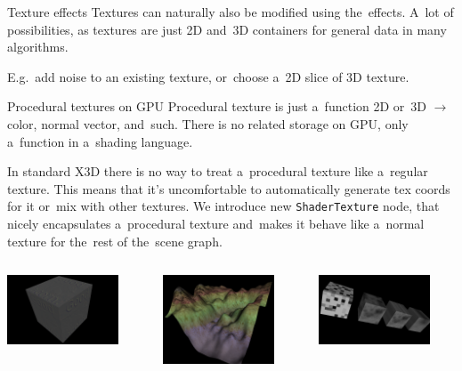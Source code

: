 \documentclass{beamer}
\begin{document}
\begin{frame}[fragile]{Texture effects}
Textures can naturally also be modified using the~effects.
A~lot of possibilities, as textures are just 2D and~3D containers for general data
in many algorithms.

\vspace{0.1in}

E.g.~add noise to an existing texture, or~choose a~2D slice of 3D texture.
\end{frame}

\begin{frame}[fragile]{Procedural textures on GPU}
Procedural texture is just a~function 2D or~3D $\rightarrow$
color, normal vector, and~such.
There is no related storage on GPU, only a~function
in a~shading language.

\vspace{0.1in}

In standard X3D there is no way to treat a~procedural texture
like a~regular texture. This means that it's uncomfortable
to automatically generate tex coords for it or~mix with other textures.
We introduce new \texttt{ShaderTexture} node, that nicely
encapsulates a~procedural texture and~makes it behave like a~normal texture
for the~rest of the~scene graph.

\begin{center}
\begin{columns}[T]
  \begin{column}{1in}
    \includegraphics[width=1.3in]{../shader_texture_edge_detection}
  \end{column}
  \begin{column}{1in}
    \includegraphics[width=1.3in]{../terrain}
  \end{column}
  \begin{column}{1in}
    \includegraphics[width=1.3in]{../noise}
  \end{column}
\end{columns}
\end{center}

\end{frame}
\end{document}
